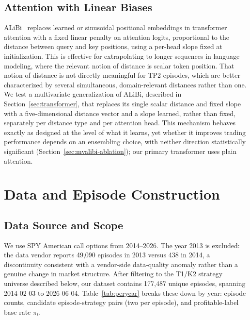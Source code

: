 \documentclass[sigconf,review,anonymous]{acmart}
\begin{document}
\subsection{Attention with Linear Biases}
ALiBi~\cite{press2022alibi} replaces learned or sinusoidal positional embeddings in transformer attention with a fixed linear penalty on attention logits, proportional to the distance between query and key positions, using a per-head slope fixed at initialization. This is effective for extrapolating to longer sequences in language modeling, where the relevant notion of distance is scalar token position. That notion of distance is not directly meaningful for TP2 episodes, which are better characterized by several simultaneous, domain-relevant distances rather than one. We test a multivariate generalization of ALiBi, described in Section~\ref{sec:transformer}, that replaces its single scalar distance and fixed slope with a five-dimensional distance vector and a slope learned, rather than fixed, separately per distance type and per attention head. This mechanism behaves exactly as designed at the level of what it learns, yet whether it improves trading performance depends on an ensembling choice, with neither direction statistically significant (Section~\ref{sec:mvalibi-ablation}); our primary transformer uses plain attention.

\section{Data and Episode Construction}
\label{sec:data}

\subsection{Data Source and Scope}
\label{sec:data-source}
We use SPY American call options from 2014--2026. The year 2013 is excluded: the data vendor reports 49{,}090 episodes in 2013 versus 438 in 2014, a discontinuity consistent with a vendor-side data-quality anomaly rather than a genuine change in market structure. After filtering to the T1/K2 strategy universe described below, our dataset contains 177{,}487 unique episodes, spanning 2014-02-03 to 2026-06-04. Table~\ref{tab:peryear} breaks these down by year: episode counts, candidate episode-strategy pairs (two per episode), and profitable-label base rate $\pi_t$.
\end{document}
